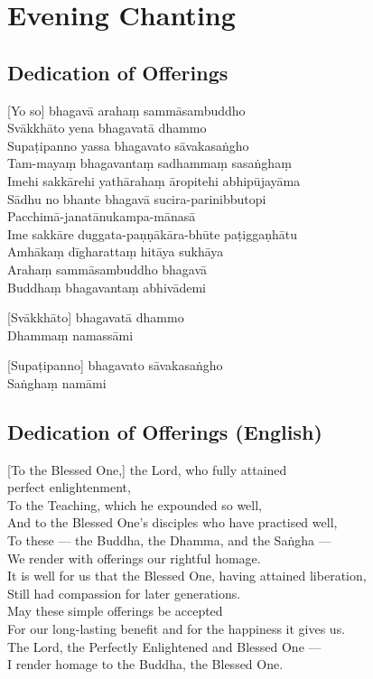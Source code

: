 
\chapter{Evening Chanting}

\section*{Dedication of Offerings}


[Yo so] bhagavā arahaṃ sammāsambuddho\\
Svākkhāto yena bhagavatā dhammo\\
Supaṭipanno yassa bhagavato sāvakasaṅgho\\
Tam-mayaṃ bhagavantaṃ sadhammaṃ sasaṅghaṃ\\
Imehi sakkārehi yathārahaṃ āropitehi abhipūjayāma\\
Sādhu no bhante bhagavā sucira-parinibbutopi\\
Pacchimā-janatānukampa-mānasā\\
Ime sakkāre duggata-paṇṇākāra-bhūte paṭiggaṇhātu\\
Amhākaṃ dīgharattaṃ hitāya sukhāya\\
Arahaṃ sammāsambuddho bhagavā\\
Buddhaṃ bhagavantaṃ abhivādemi

[Svākkhāto] bhagavatā dhammo\\
Dhammaṃ namassāmi

[Supaṭipanno] bhagavato sāvakasaṅgho\\
Saṅghaṃ namāmi

\section*{Dedication of Offerings (English)}

[To the Blessed One,] the Lord, who fully attained\\
\vin perfect enlightenment,\\
To the Teaching, which he expounded so well,\\
And to the Blessed One's disciples who have practised well,\\
To these --- the Buddha, the Dhamma, and the Saṅgha ---\\
We render with offerings our rightful homage.\\
It is well for us that the Blessed One, having attained liberation,\\
Still had compassion for later generations.\\
May these simple offerings be accepted\\
For our long-lasting benefit and for the happiness it gives us.\\
The Lord, the Perfectly Enlightened and Blessed One ---\\
I render homage to the Buddha, the Blessed One.


